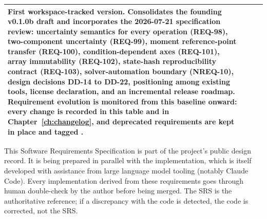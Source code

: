 \begin{tabularx}{\textwidth}{@{}llXX@{}}
First workspace-tracked version. Consolidates the founding v0.1.0b draft and
incorporates the 2026-07-21 specification review: uncertainty semantics for
every operation (REQ-98), two-component uncertainty (REQ-99), moment
reference-point transfer (REQ-100), condition-dependent axes (REQ-101),
array immutability (REQ-102), state-hash reproducibility contract (REQ-103),
solver-automation boundary (NREQ-10), design decisions DD-14 to DD-22,
positioning among existing tools, license declaration, and an incremental
release roadmap. Requirement evolution is monitored from this baseline
onward: every change is recorded in this table and in
Chapter~\ref{ch:changelog}, and deprecated requirements are kept in place
and tagged \deprecated{}.\\
\bottomrule
\end{tabularx}

\vspace{1em}
\begin{noteinfo}
This Software Requirements Specification is part of the \itc{} project's
public design record. It is being prepared in parallel with the implementation,
which is itself developed with assistance from large language model tooling
(notably Claude Code). Every implementation derived from these requirements
goes through human double-check by the author before being merged. The SRS is
the authoritative reference; if a discrepancy with the code is detected, the
code is corrected, not the SRS.
\end{noteinfo}

\clearpage
